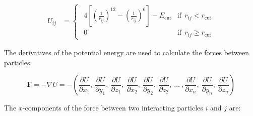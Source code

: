 \documentclass{article}
\begin{document}

\begin{eqnarray}
    U_{ij} &= 
    \begin{cases}
        \ \ 4 \left[ \left(\frac{1}{r_{ij}} \right)^{12} - \left(\frac{1}{r_{ij}} \right)^6 \right] -E_{\mathrm{cut}} & \mathrm{if}\ \ r_{ij} < r_{\mathrm{cut}}\\
        \ \ 0 & \mathrm{if}\ \ r_{ij} \ge  r_{\mathrm{cut}}
    \end{cases}
\end{eqnarray}

The derivatives of the potential energy are used to calculate the forces
between particles:

\begin{equation}
    \mathbf{F} = -\nabla U =
    -\left(
        \frac{\partial U}{\partial x_1},\
        \frac{\partial U}{\partial y_1},\
        \frac{\partial U}{\partial z_1},\
        \frac{\partial U}{\partial x_2},\
        \frac{\partial U}{\partial y_2},\
        \frac{\partial U}{\partial z_2},\
        \ldots\ ,
        \frac{\partial U}{\partial x_n},\
        \frac{\partial U}{\partial y_n},\
        \frac{\partial U}{\partial z_n}
    \right)
\end{equation}

The $x$-components of the force between two interacting particles $i$ and $j$
are:

\end{document}
